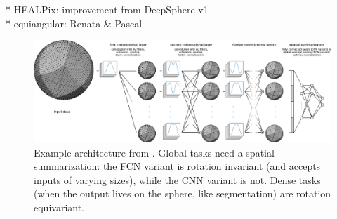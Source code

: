 \documentclass{article} %
\newcommand{\norm}[1]{\left\lVert#1\right\rVert}
\begin{document}
* HEALPix: improvement from DeepSphere v1 \cite{perraudin2019deepspherecosmo} \\
* equiangular: Renata \& Pascal \\


\begin{figure}
	\centering
	\includegraphics[width=0.9\linewidth]{figure_architecture_v3}
	\caption{Example architecture from \cite{perraudin2019deepspherecosmo}.
		Global tasks need a spatial summarization: the FCN variant is rotation invariant (and accepts inputs of varying sizes), while the CNN variant is not.
		Dense tasks (when the output lives on the sphere, like segmentation) are rotation equivariant.
	}
	\label{fig:architecture}
\end{figure}
\end{document}
